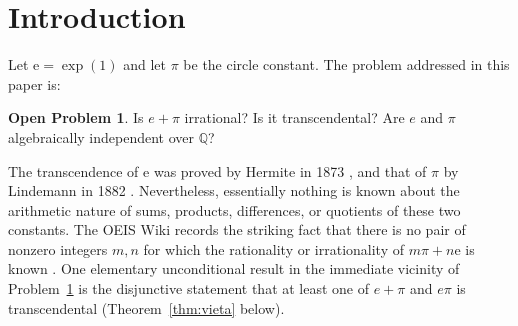 \documentclass[11pt]{amsart}
\theoremstyle{definition}
\newtheorem{problem}[theorem]{Open Problem}
\theoremstyle{remark}
\numberwithin{equation}{section}
\newcommand{\Q}{\mathbb{Q}}
\newcommand{\ee}{\mathrm{e}}
\begin{document}
\maketitle

\section{Introduction}\label{sec:intro}

Let $\ee=\exp(1)$ and let $\pi$ be the circle constant. The problem addressed in this paper is:

\begin{problem}\label{prob:main}
Is $e+\pi$ irrational? Is it transcendental? Are $e$ and $\pi$ algebraically independent over $\Q$?
\end{problem}

The transcendence of $\ee$ was proved by Hermite in 1873 \cite{Hermite1873}, and that of $\pi$ by Lindemann in 1882 \cite{Lindemann1882}. Nevertheless, essentially nothing is known about the arithmetic nature of sums, products, differences, or quotients of these two constants. The OEIS Wiki records the striking fact that there is no pair of nonzero integers $m,n$ for which the rationality or irrationality of $m\pi+n\ee$ is known \cite{OEIS}. One elementary unconditional result in the immediate vicinity of Problem~\ref{prob:main} is the disjunctive statement that at least one of $e+\pi$ and $e\pi$ is transcendental (Theorem~\ref{thm:vieta} below).
\end{document}

